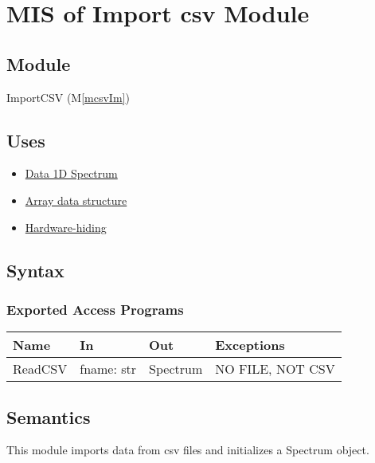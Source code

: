 \documentclass[12pt, titlepage]{article}
\newcommand{\mref}[1]{M\ref{#1}}
\begin{document}

\section{MIS of Import csv Module} \label{Mod:ImportCSV} 
\subsection{Module}
ImportCSV (\mref{mcsvIm})

\subsection{Uses}
\begin{itemize}
    \item \hyperref[Mod:Spectrum]{Data 1D Spectrum}
    \item \hyperref[Mod:Array]{Array data structure}
    \item \hyperref[Mod:HH]{Hardware-hiding}
\end{itemize}

\subsection{Syntax}

\subsubsection{Exported Access Programs}

\begin{center}
    \begin{tabular}{p{2cm} p{4cm} p{4cm} p{5cm}}
        \hline
        \textbf{Name} & \textbf{In} & \textbf{Out} & \textbf{Exceptions} \\
        \hline
        ReadCSV & fname: str & Spectrum & NO FILE, NOT CSV\\
        \hline
    \end{tabular}
\end{center}


\subsection{Semantics}
This module imports data from csv files and initializes a Spectrum object.
\end{document}

